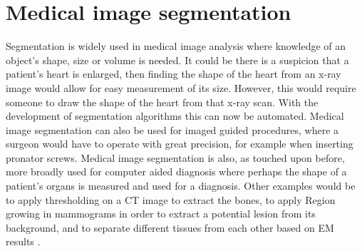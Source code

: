 \section{Medical image segmentation}
Segmentation is widely used in medical image analysis where knowledge of an object's shape, size or volume is needed. It could be there is a suspicion that a patient's heart is enlarged, then finding the shape of the heart from an x-ray image would allow for easy measurement of its size. However, this would require someone to draw the shape of the heart from that x-ray scan. With the development of segmentation algorithms this can now be automated. Medical image segmentation can also be used for imaged guided procedures, where a surgeon would have to operate with great precision, for example when inserting pronator screws. Medical image segmentation is also, as touched upon before, more broadly used for computer aided diagnosis where perhaps the shape of a patient's organs is measured and used for a diagnosis. Other examples would be to apply thresholding on a CT image to extract the bones, to apply Region growing in mammograms in order to extract a potential lesion from its background, and to separate different tissues from each other based on EM results \cite{otherExamples}.

